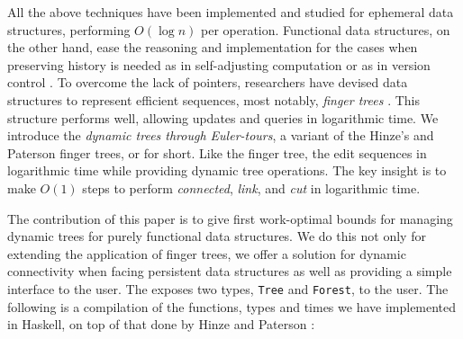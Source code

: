 All the above techniques have been implemented and studied for ephemeral data structures, performing $O(\log n)$ per operation. Functional data structures, on the other hand, ease the reasoning and implementation for the cases when preserving history is needed as in self-adjusting computation \cite{DynamizingAlgos} or as in version control \cite{CVS-Demaine}. To overcome the lack of pointers, researchers have devised data structures to represent efficient sequences, most notably, \textit{finger trees} \cite{FTs}. This structure performs well, allowing updates and queries in logarithmic time. We introduce the \emph{dynamic trees through Euler-tours}, a variant of the Hinze's and Paterson finger trees, or \dyntset for short. Like the finger tree, the \dyntset edit sequences in logarithmic time while providing dynamic tree operations. The key insight is to make $O(1)$ steps to perform \textit{connected}, \textit{link}, and \textit{cut} in logarithmic time. 

The contribution of this paper is to give first work-optimal bounds for managing dynamic trees for purely functional data structures. We do this not only for extending the application of finger trees, we offer a solution for dynamic connectivity when facing persistent data structures as well as providing a simple interface to the user. The \dyntset exposes two types, \texttt{Tree} and \texttt{Forest}, to the user. The following is a compilation of  the functions, types and times we have implemented in Haskell, on top of that done by Hinze and Paterson \cite{FTs}:

